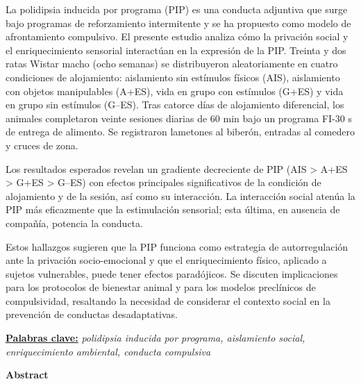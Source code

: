 \documentclass[12pt,a4paper]{article}
\begin{document}
    \begin{center}
    \begin{minipage}{0.9\textwidth}
    \noindent
    La polidipsia inducida por programa (PIP) es una conducta adjuntiva que surge bajo programas de reforzamiento intermitente y se ha propuesto como modelo de afrontamiento compulsivo. El presente estudio analiza cómo la privación social y el enriquecimiento sensorial interactúan en la expresión de la PIP. Treinta y dos ratas Wistar macho (ocho semanas) se distribuyeron aleatoriamente en cuatro condiciones de alojamiento: aislamiento sin estímulos físicos (AIS), aislamiento con objetos manipulables (A+ES), vida en grupo con estímulos (G+ES) y vida en grupo sin estímulos (G--ES). Tras catorce días de alojamiento diferencial, los animales completaron veinte sesiones diarias de 60 min bajo un programa FI-30 s de entrega de alimento. Se registraron lametones al biberón, entradas al comedero y cruces de zona.
    
    Los resultados esperados revelan un gradiente decreciente de PIP (AIS > A+ES > G+ES > G--ES) con efectos principales significativos de la condición de alojamiento y de la sesión, así como su interacción. La interacción social atenúa la PIP más eficazmente que la estimulación sensorial; esta última, en ausencia de compañía, potencia la conducta.

    Estos hallazgos sugieren que la PIP funciona como estrategia de autorregulación ante la privación socio-emocional y que el enriquecimiento físico, aplicado a sujetos vulnerables, puede tener efectos paradójicos. Se discuten implicaciones para los protocolos de bienestar animal y para los modelos preclínicos de compulsividad, resaltando la necesidad de considerar el contexto social en la prevención de conductas desadaptativas.
    
    \vspace{2mm}
    \noindent
    \underline{\textbf{Palabras clave:}} \textit{polidipsia inducida por programa, aislamiento social, enriquecimiento ambiental, conducta compulsiva}
    \end{minipage}
    \end{center}
    
    \vspace{5mm}
    
    \begin{center}
    \textbf{\large Abstract}
    \end{center}
    
\end{document}
